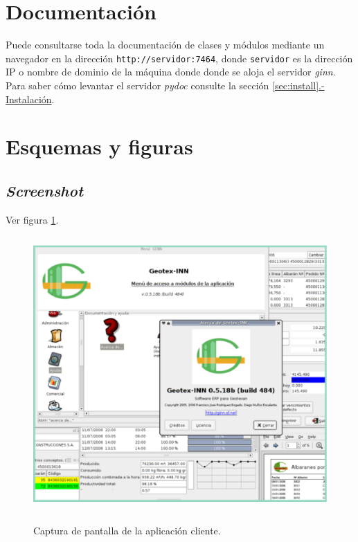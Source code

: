 \documentclass[a4paper]{article}
\newcommand{\marginalnote}[1]{\mbox{}\marginpar{\raggedright\hspace{0pt}#1}}
\newcommand{\iconomargen}[2]{%
  \marginalnote{%
    \parbox[t][\baselineskip * (#1-1)][b]{\marginparwidth}{%
      \texttt{[image: \#2]}%
    }
  }
}
\begin{document}
    \section{Documentación} \label{sec:doc}
\iconomargen{3}{link}
    Puede consultarse toda la documentación de clases y módulos mediante un navegador en la dirección \texttt{http://servidor:7464}, donde \texttt{servidor} es la dirección IP o nombre de dominio de la máquina donde donde se aloja el servidor \emph{ginn}.\\
    Para saber cómo levantar el servidor \emph{pydoc} consulte la sección \underline{\ref{sec:install}.- Instalación}.
    \section{Esquemas y figuras}
        \subsection{\emph{Screenshot}}
\iconomargen{2}{pantallazo.eps}        Ver figura \ref{screenshot}.
        \begin{figure}[!ht]
            \centering
                    \includegraphics[width=12.5cm,height=10.5cm]{pantallazo.eps}\\
                \caption{Captura de pantalla de la aplicación cliente.}
                \label{screenshot}
        \end{figure}\par
\end{document}
